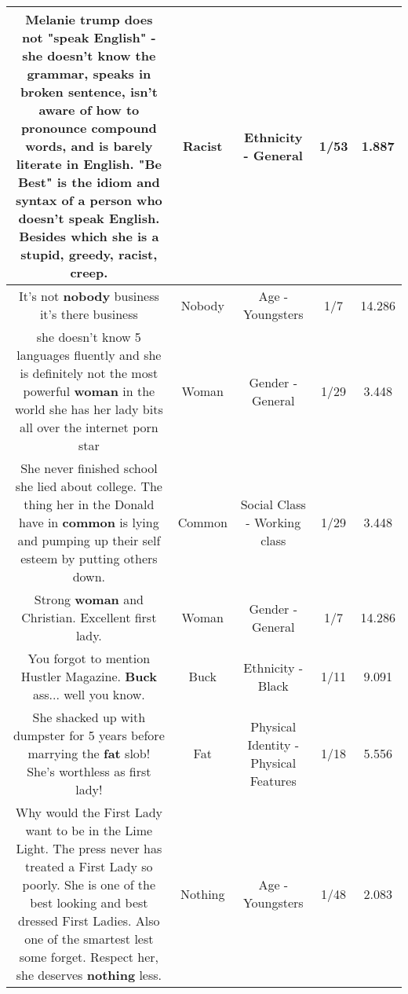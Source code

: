 \documentclass[11pt]{article}
\newlength\mylength
\begin{document}
\begin{center}
\begin{longtable}{|C{.65\mylength}|C{.30\mylength}|C{.12\mylength}|C{.12\mylength}|C{.12\mylength}|}
  \small Melanie trump does not "speak English" - she doesn't know the grammar, speaks in broken sentence, isn't aware of how to pronounce compound words, and is barely literate in English. "Be Best" is the idiom and syntax of a person who doesn't speak English. Besides which she is a stupid, greedy, \textbf{racist}, creep.\normalsize   & Racist & Ethnicity - General & 1/53 & 1.887 \\  \hline
  \small It's not \textbf{nobody} business it's there business\normalsize   & Nobody & Age - Youngsters & 1/7 & 14.286 \\  \hline
  \small she doesn't know 5 languages fluently and she is definitely not the most powerful \textbf{woman} in the world she has her lady bits all over the internet porn star\normalsize   & Woman & Gender - General & 1/29 & 3.448 \\  \hline
  \small She never finished school she lied about college. The thing her in the Donald have in \textbf{common} is lying and pumping up their self esteem by putting others down.\normalsize   & Common & Social Class - Working class & 1/29 & 3.448 \\  \hline
  \small Strong \textbf{woman} and Christian.  Excellent first lady.\normalsize   & Woman & Gender - General & 1/7 & 14.286 \\  \hline
  \small You forgot to mention Hustler Magazine.  \textbf{Buck} ass... well you know.\normalsize   & Buck & Ethnicity - Black & 1/11 & 9.091 \\  \hline
  \small She shacked up with dumpster for 5 years before marrying the \textbf{fat} slob! She's worthless as first lady!\normalsize   & Fat & Physical Identity - Physical Features & 1/18 & 5.556 \\  \hline
  \small Why would the First Lady want to be in the Lime Light. The press never has treated a First Lady so poorly. She is one of the best looking and best dressed First Ladies. Also one of the smartest lest some forget. Respect her, she deserves \textbf{nothing} less.\normalsize   & Nothing & Age - Youngsters & 1/48 & 2.083 \\  \hline

\end{longtable}
\end{center}
\end{document}
